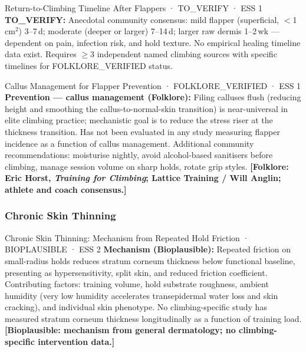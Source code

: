 \begin{toverifybox}{Return-to-Climbing Timeline After Flappers · TO\_VERIFY · ESS 1}
\textbf{TO\_VERIFY:} Anecdotal community consensus: mild flapper (superficial, $<$1\,cm$^2$) 3--7\,d; moderate (deeper or larger) 7--14\,d; larger raw dermis 1--2\,wk --- dependent on pain, infection risk, and hold texture. No empirical healing timeline data exist. Requires $\geq$3 independent named climbing sources with specific timelines for FOLKLORE\_VERIFIED status.
\end{toverifybox}

\begin{folklorebox}{Callus Management for Flapper Prevention · FOLKLORE\_VERIFIED · ESS 1}
\textbf{Prevention --- callus management (Folklore):} Filing calluses flush (reducing height and smoothing the callus-to-normal-skin transition) is near-universal in elite climbing practice; mechanistic goal is to reduce the stress riser at the thickness transition. Has not been evaluated in any study measuring flapper incidence as a function of callus management. Additional community recommendations: moisturise nightly, avoid alcohol-based sanitisers before climbing, manage session volume on sharp holds, rotate grip styles. \textbf{[Folklore: Eric Horst, \textit{Training for Climbing}; Lattice Training / Will Anglin; athlete and coach consensus.]}
\end{folklorebox}

\subsubsection{Chronic Skin Thinning}

\begin{bioplausbox}{Chronic Skin Thinning: Mechanism from Repeated Hold Friction · BIOPLAUSIBLE · ESS 2}
\textbf{Mechanism (Bioplausible):} Repeated friction on small-radius holds reduces stratum corneum thickness below functional baseline, presenting as hypersensitivity, split skin, and reduced friction coefficient. Contributing factors: training volume, hold substrate roughness, ambient humidity (very low humidity accelerates transepidermal water loss and skin cracking), and individual skin phenotype. No climbing-specific study has measured stratum corneum thickness longitudinally as a function of training load. \textbf{[Bioplausible: mechanism from general dermatology; no climbing-specific intervention data.]}
\end{bioplausbox}


